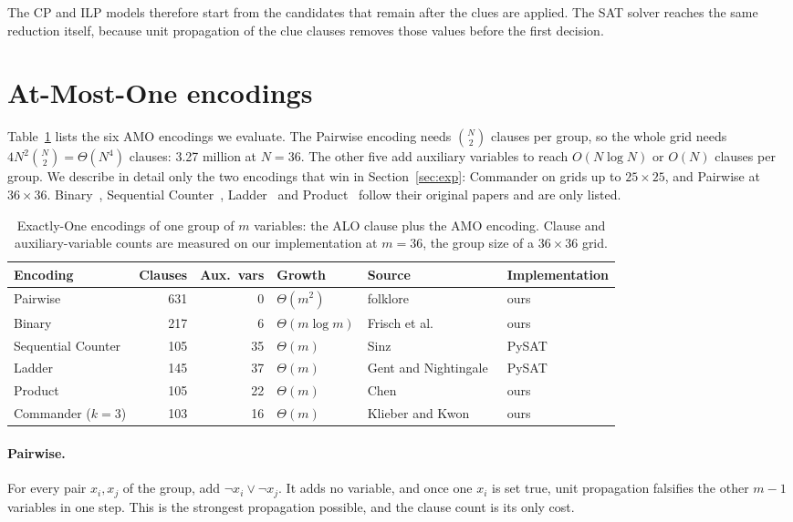 The CP and ILP models therefore start from the candidates that remain after the clues are applied. The SAT solver reaches the same reduction itself, because unit propagation of the clue clauses removes those values before the first decision.

\section{At-Most-One encodings}\label{sec:amo}

Table~\ref{tab:amo} lists the six AMO encodings we evaluate. The Pairwise encoding needs $\binom{N}{2}$ clauses per group, so the whole grid needs $4N^2\binom{N}{2}=\Theta(N^4)$ clauses: 3.27 million at $N=36$. The other five add auxiliary variables to reach $O(N\log N)$ or $O(N)$ clauses per group. We describe in detail only the two encodings that win in Section~\ref{sec:exp}: Commander on grids up to $25\times25$, and Pairwise at $36\times36$. Binary~\cite{frisch2005}, Sequential Counter~\cite{sinz2005}, Ladder~\cite{gent2004} and Product~\cite{chen2010} follow their original papers and are only listed.

\begin{table}[t]
\caption{Exactly-One encodings of one group of $m$ variables: the ALO clause plus the AMO encoding. Clause and auxiliary-variable counts are measured on our implementation at $m=36$, the group size of a $36\times36$ grid.}\label{tab:amo}
\centering\small
\begin{tabular}{lrrlll}
\toprule
Encoding & Clauses & Aux.\ vars & Growth & Source & Implementation \\
\midrule
Pairwise & 631 & 0 & $\Theta(m^2)$ & folklore & ours \\
Binary & 217 & 6 & $\Theta(m\log m)$ & Frisch et al.~\cite{frisch2005} & ours \\
Sequential Counter & 105 & 35 & $\Theta(m)$ & Sinz~\cite{sinz2005} & PySAT \\
Ladder & 145 & 37 & $\Theta(m)$ & Gent and Nightingale~\cite{gent2004} & PySAT \\
Product & 105 & 22 & $\Theta(m)$ & Chen~\cite{chen2010} & ours \\
Commander ($k=3$) & 103 & 16 & $\Theta(m)$ & Klieber and Kwon~\cite{klieber2007} & ours \\
\bottomrule
\end{tabular}
\end{table}

\paragraph{Pairwise.} For every pair $x_i,x_j$ of the group, add $\neg x_i\vee\neg x_j$. It adds no variable, and once one $x_i$ is set true, unit propagation falsifies the other $m-1$ variables in one step. This is the strongest propagation possible, and the clause count is its only cost.


